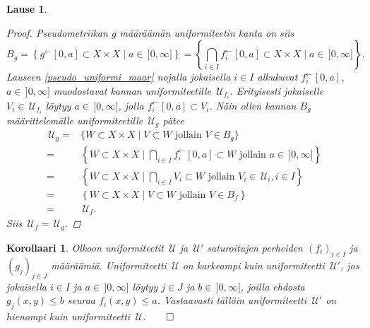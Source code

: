 \documentclass[12pt,a4paper,leqno]{report}
\newcommand{\U}{\,\mathcal{U}}
\theoremstyle{plain}
\newtheorem{lause}[equation]{Lause}
\newtheorem{kor}[equation]{Korollaari}
\theoremstyle{definition}
\theoremstyle{remark}
\begin{document}
\begin{lause}
\begin{proof}
%
Pseudometriikan $g
$
määräämän uniformiteetin kanta on siis
$$B_g=\left\{g^\leftarrow[0,a]\subset X\times X\mid a\in\,]0,\infty]\right\}
=\left\{\bigcap_{i\in I} f_i^\leftarrow[0,a]\subset X\times X\mid a\in\,]0,\infty]\right\}.$$
Lauseen \ref{pseudo_uniformi_maar} nojalla jokaisella $i\in I$ 
alkukuvat $f_i^\leftarrow[0,a]$, $a\in\,]0,\infty]$ 
muodostavat kannan uniformiteetille $\U_{f_i}$. 
Erityisesti jokaiselle $V_i\in\U_{f_i}$ löytyy $a\in \,]0,\infty]$, 
jolla $ f_i^\leftarrow[0,a]\subset V_i$.
Näin ollen kannan $B_g$ määrittelemälle uniformiteetille $\U_g$ pätee 
\begin{equation*}
\begin{split}
\U_g=&\{W\subset X\times X\mid V\subset W\text{ jollain }V\in B_g\}\\
=&\left\{W\subset X\times X\mid \bigcap_{i\in I} f_i^\leftarrow[0,a]\subset W\text{ jollain }a\in\,]0,\infty]\right\}\\
=&\left\{W\subset X\times X\mid \bigcap_{i\in I} V_i\subset W\text{ jollain }V_i\in \U_i,i\in I\right\}\\
=&\left\{W\subset X\times X\mid V\subset W\text{ jollain }V\in B_f\right\}\\
=&\U_f.
\end{split}
\end{equation*}
Siis $\U_{f}= \U_{g}$. 
\end{proof}
\end{lause}
\begin{kor}
Olkoon uniformiteetit $\U$ ja $\U'$ saturoitujen perheiden 
$(f_i)_{i\in I}$ ja $(g_j)_{j\in J}$ määräämiä. 
Uniformiteetti $\U$ on karkeampi kuin uniformiteetti $\U'$, 
jos jokaisella $i\in I$ ja $a\in\,]0,\infty]$ löytyy $j\in J$ ja $b\in\,]0,\infty]$, 
joilla ehdosta $g_j(x,y)\leq b$ seuraa $f_i(x,y)\leq a$. 
Vastaavasti tällöin uniformiteetti $\U'$ on hienompi kuin uniformiteetti $\U$.$\qed$
\end{kor}
\end{document}
